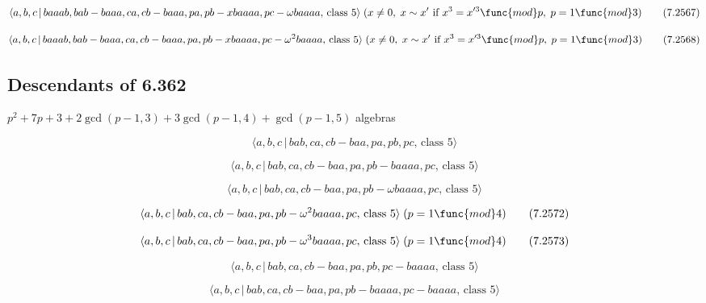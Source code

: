 \documentclass[10pt]{article}
\begin{document}
\begin{equation}
\langle a,b,c\,|\,baaab,bab-baaa,ca,cb-baaa,pa,pb-xbaaaa,pc-\omega baaaa,\,%
\text{class }5\rangle \;(x\neq 0,\;x\sim x^{\prime }\text{ if }%
x^{3}=x^{\prime 3}\func{mod}p,\;p=1\func{mod}3)  \tag{7.2567}
\end{equation}

\begin{equation}
\langle a,b,c\,|\,baaab,bab-baaa,ca,cb-baaa,pa,pb-xbaaaa,pc-\omega
^{2}baaaa,\,\text{class }5\rangle \;(x\neq 0,\;x\sim x^{\prime }\text{ if }%
x^{3}=x^{\prime 3}\func{mod}p,\;p=1\func{mod}3)  \tag{7.2568}
\end{equation}

\subsection{Descendants of 6.362}

$p^{2}+7p+3+2\gcd (p-1,3)+3\gcd (p-1,4)+\gcd (p-1,5)$ algebras

\begin{equation}
\langle a,b,c\,|\,bab,ca,cb-baa,pa,pb,pc,\,\text{class }5\rangle 
\tag{7.2569}
\end{equation}

\begin{equation}
\langle a,b,c\,|\,bab,ca,cb-baa,pa,pb-baaaa,pc,\,\text{class }5\rangle 
\tag{7.2570}
\end{equation}

\begin{equation}
\langle a,b,c\,|\,bab,ca,cb-baa,pa,pb-\omega baaaa,pc,\,\text{class }5\rangle
\tag{7.2571}
\end{equation}

\begin{equation}
\langle a,b,c\,|\,bab,ca,cb-baa,pa,pb-\omega ^{2}baaaa,pc,\,\text{class }%
5\rangle \;(p=1\func{mod}4)  \tag{7.2572}
\end{equation}

\begin{equation}
\langle a,b,c\,|\,bab,ca,cb-baa,pa,pb-\omega ^{3}baaaa,pc,\,\text{class }%
5\rangle \;(p=1\func{mod}4)  \tag{7.2573}
\end{equation}

\begin{equation}
\langle a,b,c\,|\,bab,ca,cb-baa,pa,pb,pc-baaaa,\,\text{class }5\rangle 
\tag{7.2574}
\end{equation}

\begin{equation}
\langle a,b,c\,|\,bab,ca,cb-baa,pa,pb-baaaa,pc-baaaa,\,\text{class }5\rangle
\tag{7.2575}
\end{equation}
\end{document}
